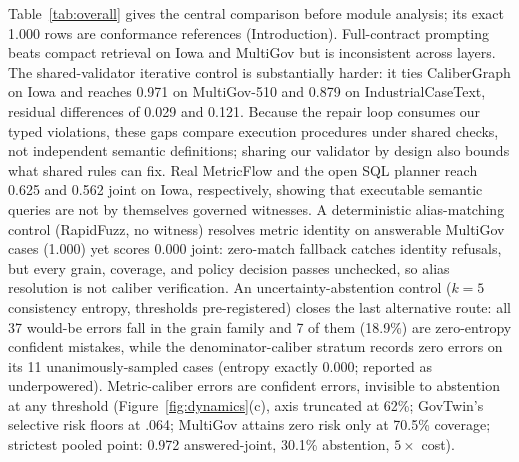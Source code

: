 \documentclass[letterpaper]{article}
\begin{document}
 Table~\ref{tab:overall} gives the central comparison before module analysis; its exact 1.000 rows are conformance references (Introduction). Full-contract prompting beats compact retrieval on Iowa and MultiGov but is inconsistent across layers. The shared-validator iterative control is substantially harder: it ties CaliberGraph on Iowa and reaches 0.971 on MultiGov-510 and 0.879 on IndustrialCaseText, residual differences of 0.029 and 0.121. Because the repair loop consumes our typed violations, these gaps compare execution procedures under shared checks, not independent semantic definitions; sharing our validator by design also bounds what shared rules can fix. Real MetricFlow \citep{metricflow2026} and the open SQL planner reach 0.625 and 0.562 joint on Iowa, respectively, showing that executable semantic queries are not by themselves governed witnesses. A deterministic alias-matching control (RapidFuzz, no witness) resolves metric identity on answerable MultiGov cases (1.000) yet scores 0.000 joint: zero-match fallback catches identity refusals, but every grain, coverage, and policy decision passes unchecked, so alias resolution is not caliber verification. An uncertainty-abstention control ($k{=}5$ consistency entropy, thresholds pre-registered) closes the last alternative route: all 37 would-be errors fall in the grain family and 7 of them (18.9\%) are zero-entropy confident mistakes, while the denominator-caliber stratum records zero errors on its 11 unanimously-sampled cases (entropy exactly 0.000; reported as underpowered). Metric-caliber errors are confident errors, invisible to abstention at any threshold (Figure~\ref{fig:dynamics}(c), axis truncated at 62\%; GovTwin's selective risk floors at .064; MultiGov attains zero risk only at 70.5\% coverage; strictest pooled point: 0.972 answered-joint, 30.1\% abstention, $5\times$ cost).
\end{document}
